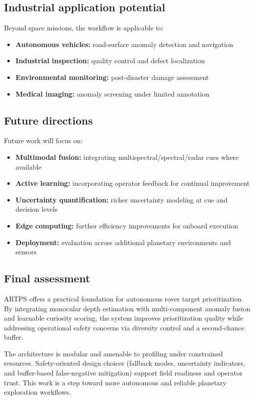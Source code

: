 \documentclass[12pt]{article}
\begin{document}
\subsection{Industrial application potential}
Beyond space missions, the workflow is applicable to:

\begin{itemize}
\item \textbf{Autonomous vehicles:} road-surface anomaly detection and navigation
\item \textbf{Industrial inspection:} quality control and defect localization
\item \textbf{Environmental monitoring:} post-disaster damage assessment
\item \textbf{Medical imaging:} anomaly screening under limited annotation
\end{itemize}

\subsection{Future directions}
Future work will focus on:

\begin{itemize}
\item \textbf{Multimodal fusion:} integrating multispectral/spectral/radar cues where available
\item \textbf{Active learning:} incorporating operator feedback for continual improvement
\item \textbf{Uncertainty quantification:} richer uncertainty modeling at cue and decision levels
\item \textbf{Edge computing:} further efficiency improvements for onboard execution
\item \textbf{Deployment:} evaluation across additional planetary environments and sensors
\end{itemize}

\subsection{Final assessment}
ARTPS offers a practical foundation for autonomous rover target prioritization. By integrating monocular depth estimation with multi-component anomaly fusion and learnable curiosity scoring, the system improves prioritization quality while addressing operational safety concerns via diversity control and a second-chance buffer.

The architecture is modular and amenable to profiling under constrained resources. Safety-oriented design choices (fallback modes, uncertainty indicators, and buffer-based false-negative mitigation) support field readiness and operator trust. This work is a step toward more autonomous and reliable planetary exploration workflows.
\end{document}
